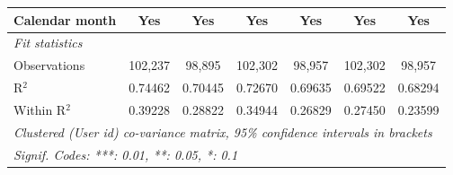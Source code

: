\begin{table}[htbp]
\begin{threeparttable}[b]
\begin{tabular}{lcccccc}
         Calendar month                   & Yes                  & Yes                  & Yes                  & Yes                  & Yes                  & Yes\\  
         \midrule
         \emph{Fit statistics}\\
         Observations                     & 102,237              & 98,895               & 102,302              & 98,957               & 102,302              & 98,957\\  
         R$^2$                            & 0.74462              & 0.70445              & 0.72670              & 0.69635              & 0.69522              & 0.68294\\  
         Within R$^2$                     & 0.39228              & 0.28822              & 0.34944              & 0.26829              & 0.27450              & 0.23599\\  
         \midrule \midrule
         \multicolumn{7}{l}{\emph{Clustered (User id) co-variance matrix, 95\% confidence intervals in brackets}}\\
         \multicolumn{7}{l}{\emph{Signif. Codes: ***: 0.01, **: 0.05, *: 0.1}}\\
      \end{tabular}
   \end{threeparttable}
\end{table}


